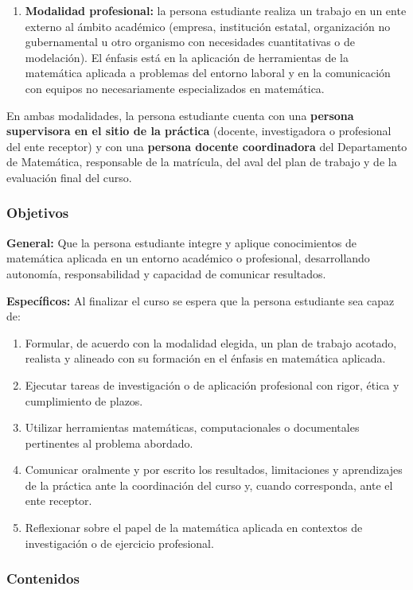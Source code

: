 \begin{refsection}
\begin{enumerate}
\item \textbf{Modalidad profesional:} la persona estudiante realiza un trabajo en un ente externo al ámbito académico (empresa, institución estatal, organización no gubernamental u otro organismo con necesidades cuantitativas o de modelación). El énfasis está en la aplicación de herramientas de la matemática aplicada a problemas del entorno laboral y en la comunicación con equipos no necesariamente especializados en matemática.
\end{enumerate}

En ambas modalidades, la persona estudiante cuenta con una \textbf{persona supervisora en el sitio de la práctica} (docente, investigadora o profesional del ente receptor) y con una \textbf{persona docente coordinadora} del Departamento de Matemática, responsable de la matrícula, del aval del plan de trabajo y de la evaluación final del curso.

\subsubsection*{Objetivos}

\textbf{General:} Que la persona estudiante integre y aplique conocimientos de matemática aplicada en un entorno académico o profesional, desarrollando autonomía, responsabilidad y capacidad de comunicar resultados.

\textbf{Específicos:} Al finalizar el curso se espera que la persona estudiante sea capaz de:

\begin{enumerate}
\item Formular, de acuerdo con la modalidad elegida, un plan de trabajo acotado, realista y alineado con su formación en el énfasis en matemática aplicada.
\item Ejecutar tareas de investigación o de aplicación profesional con rigor, ética y cumplimiento de plazos.
\item Utilizar herramientas matemáticas, computacionales o documentales pertinentes al problema abordado.
\item Comunicar oralmente y por escrito los resultados, limitaciones y aprendizajes de la práctica ante la coordinación del curso y, cuando corresponda, ante el ente receptor.
\item Reflexionar sobre el papel de la matemática aplicada en contextos de investigación o de ejercicio profesional.
\end{enumerate}

\subsubsection*{Contenidos}


\end{refsection}
